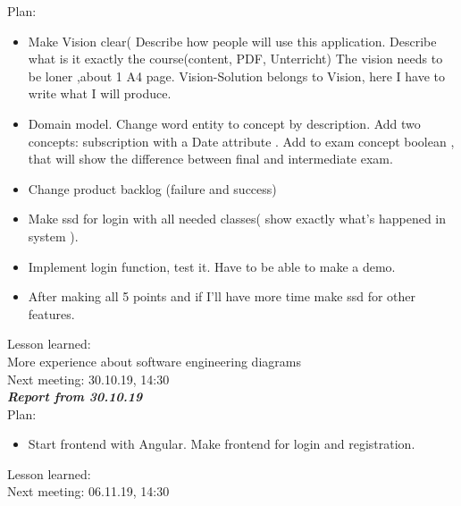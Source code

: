 \documentclass{scrartcl}
\begin{document}
Plan:
\begin{itemize}


 
	\item	Make Vision clear( Describe how people will use this application. Describe what is it exactly the course(content, PDF, Unterricht) The vision needs to be loner ,about 1 A4 page.
Vision-Solution belongs to Vision, here I have to write what I will produce.
	\item	Domain model. Change word entity to concept by description.
Add two concepts: subscription with a Date attribute .
Add to exam concept boolean , that will show the difference between final and intermediate exam.
	\item	Change product backlog (failure and success) 
	\item	Make ssd for login with all needed classes( show exactly what’s happened in system ). 
	\item	Implement login function, test it. Have to be able to make a demo.
	\item	After making all 5 points and if I’ll have more time make ssd for other features.
	\end{itemize}
Lesson learned: \\
More experience about software engineering diagrams\\
Next meeting: 30.10.19, 14:30\\


\textbf{\textit{Report from 30.10.19}}\\
Plan:\\
\begin{itemize}


	\item	Start frontend with Angular. Make frontend for login and registration.
	\end{itemize}
Lesson learned:\\

Next meeting: 06.11.19, 14:30\\
\end{document}
